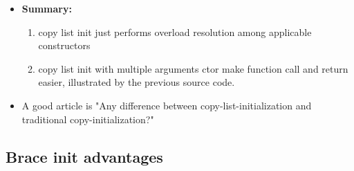 \documentclass[a4paper,11pt,twoside]{book}
\begin{document}
\begin{itemize}
	
	\item \textbf{Summary:}
	\begin{enumerate}
		\item copy list init just performs overload resolution among applicable constructors
		
		\item copy list init with multiple arguments ctor make function call and return easier, illustrated by the previous source code.
	\end{enumerate}
	
	\item A good article is "Any difference between copy-list-initialization and traditional copy-initialization?"
	
	
\end{itemize}


\subsection{Brace init advantages}
			 
\end{document}
